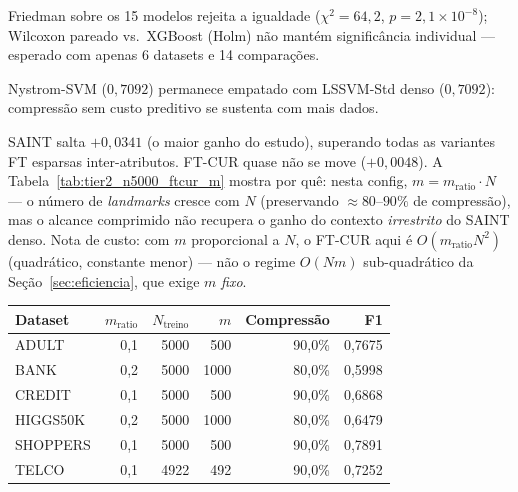 \documentclass[12pt,a4paper]{article}
\begin{document}
Friedman sobre os 15 modelos rejeita a igualdade ($\chi^2=64{,}2$,
$p=2{,}1\times10^{-8}$); Wilcoxon pareado vs.\ XGBoost (Holm) não mantém
significância individual --- esperado com apenas 6 datasets e 14 comparações.

\begin{tcolorbox}[colback=fixbg, colframe=fixborder, fonttitle=\bfseries,
  title=\textbf{Achado 1 --- Nyström continua fiel em $N=5000$}]
Nystrom-SVM ($0{,}7092$) permanece empatado com LSSVM-Std denso ($0{,}7092$):
compressão sem custo preditivo se sustenta com mais dados.
\end{tcolorbox}

\begin{tcolorbox}[colback=warnbg, colframe=warnborder, fonttitle=\bfseries,
  title=\textbf{Achado 2 --- atenção inter-instâncias densa (SAINT) ganha mais
  com $N$ do que sua versão comprimida (FT-CUR)}]
SAINT salta $+0{,}0341$ (o maior ganho do estudo), superando todas as
variantes FT esparsas inter-atributos. FT-CUR quase não se move
($+0{,}0048$). A Tabela~\ref{tab:tier2_n5000_ftcur_m} mostra por quê: nesta
config, $m = m_{\text{ratio}} \cdot N$ --- o número de \emph{landmarks} cresce
com $N$ (preservando $\approx 80$--$90\%$ de compressão), mas o alcance
comprimido não recupera o ganho do contexto \emph{irrestrito} do SAINT denso.
Nota de custo: com $m$ proporcional a $N$, o FT-CUR aqui é
$O(m_{\text{ratio}} N^2)$ (quadrático, constante menor) --- não o regime
$O(Nm)$ sub-quadrático da Seção~\ref{sec:eficiencia}, que exige $m$
\emph{fixo}.

\begin{center}
\begin{tabular}{lrrrrr}
\toprule
\textbf{Dataset} & $m_{\text{ratio}}$ & $N_{\text{treino}}$ & $m$ & \textbf{Compressão} & \textbf{F1} \\
\midrule
ADULT    & 0,1 & 5000 & 500  & 90,0\% & 0,7675 \\
BANK     & 0,2 & 5000 & 1000 & 80,0\% & 0,5998 \\
CREDIT   & 0,1 & 5000 & 500  & 90,0\% & 0,6868 \\
HIGGS50K & 0,2 & 5000 & 1000 & 80,0\% & 0,6479 \\
SHOPPERS & 0,1 & 5000 & 500  & 90,0\% & 0,7891 \\
TELCO    & 0,1 & 4922 & 492  & 90,0\% & 0,7252 \\
\bottomrule
\end{tabular}
\label{tab:tier2_n5000_ftcur_m}
\end{center}
\end{tcolorbox}
\end{document}

